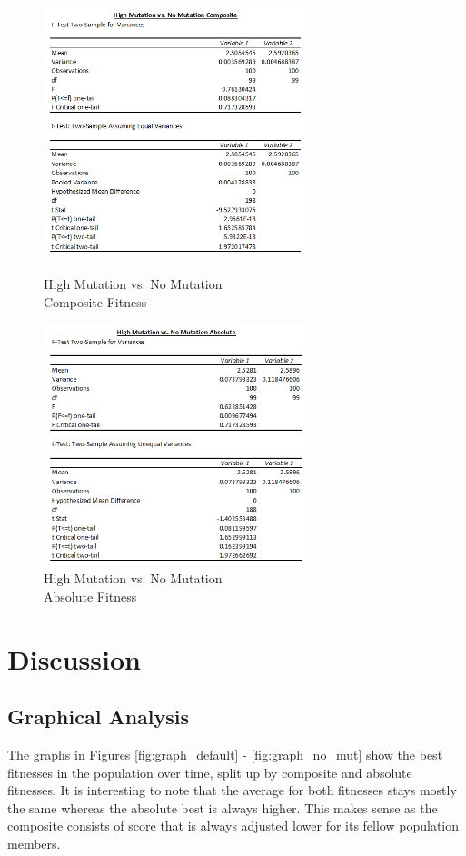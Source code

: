 \documentclass[11pt]{article}
\begin{document}
\begin{figure}[ht]
\centering
\begin{minipage}{.48\textwidth}
  \includegraphics[width=3in]{high_vs_no_comp.png}
  \caption{High Mutation vs. No Mutation \\Composite Fitness}
  \label{fig:high_vs_no_comp}
\end{minipage}\hfill
\begin{minipage}{.48\textwidth}
  \includegraphics[width=3in]{high_vs_no_abs.png}
  \caption{High Mutation vs. No Mutation \\Absolute Fitness}
  \label{fig:high_vs_no_abs}
\end{minipage}
\end{figure}

\section{Discussion}\label{sect:discussion}

\subsection{Graphical Analysis}\label{sect:graph_anal}
The graphs in Figures \ref{fig:graph_default} - \ref{fig:graph_no_mut} show the best fitnesses in the population over time, split up by composite and absolute fitnesses. It is interesting to note that the average for both fitnesses stays mostly the same whereas the absolute best is always higher. This makes sense as the composite consists of score that is always adjusted lower for its fellow population members.
\end{document}
